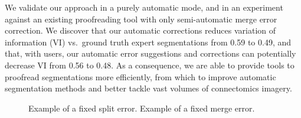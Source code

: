 We validate our approach in a purely automatic mode, and in an experiment against an existing proofreading tool with only semi-automatic merge error correction\cite{haehn_dojo_2014}. We discover that our automatic corrections reduces variation of information (VI) vs.~ground truth expert segmentations from 0.59 to 0.49, and that, with users, our automatic error suggestions and corrections can potentially decrease VI from 0.56 to 0.48. As a consequence, we are able to provide tools to proofread segmentations more efficiently, from which to improve automatic segmentation methods and better tackle vast volumes of connectomics imagery.

%

\begin{figure}
\caption{Example of a fixed split error. Example of a fixed merge error.}
\end{figure}